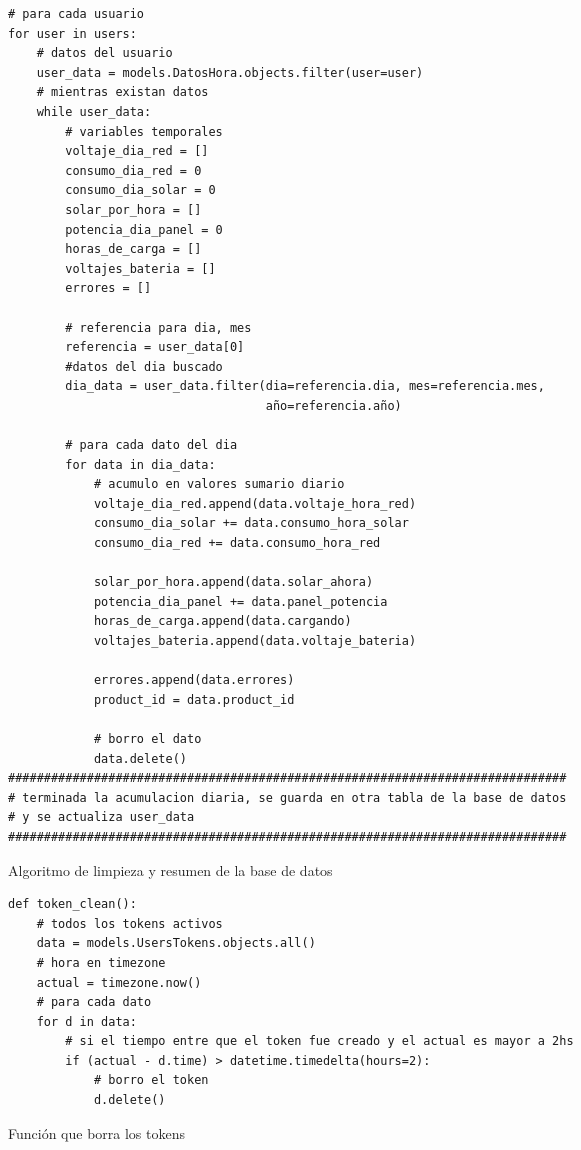 \begin{listing}[H]
\begin{verbatim}
# para cada usuario
for user in users:
    # datos del usuario
    user_data = models.DatosHora.objects.filter(user=user)
    # mientras existan datos
    while user_data:
        # variables temporales
        voltaje_dia_red = []
        consumo_dia_red = 0
        consumo_dia_solar = 0
        solar_por_hora = []
        potencia_dia_panel = 0
        horas_de_carga = []
        voltajes_bateria = []
        errores = []

        # referencia para dia, mes
        referencia = user_data[0]
        #datos del dia buscado
        dia_data = user_data.filter(dia=referencia.dia, mes=referencia.mes, 
                                    año=referencia.año)

        # para cada dato del dia
        for data in dia_data:
            # acumulo en valores sumario diario
            voltaje_dia_red.append(data.voltaje_hora_red)
            consumo_dia_solar += data.consumo_hora_solar
            consumo_dia_red += data.consumo_hora_red

            solar_por_hora.append(data.solar_ahora)
            potencia_dia_panel += data.panel_potencia
            horas_de_carga.append(data.cargando)
            voltajes_bateria.append(data.voltaje_bateria)

            errores.append(data.errores)
            product_id = data.product_id

            # borro el dato
            data.delete()
##############################################################################
# terminada la acumulacion diaria, se guarda en otra tabla de la base de datos
# y se actualiza user_data
##############################################################################
\end{verbatim}
\caption{Algoritmo de limpieza y resumen de la base de datos}
\label{algoritmo_sorter_user_mngmnt}
\end{listing}



\begin{listing}[H]
\begin{verbatim}
def token_clean():
    # todos los tokens activos
    data = models.UsersTokens.objects.all()
    # hora en timezone
    actual = timezone.now()
    # para cada dato
    for d in data:
        # si el tiempo entre que el token fue creado y el actual es mayor a 2hs
        if (actual - d.time) > datetime.timedelta(hours=2):
            # borro el token
            d.delete()
\end{verbatim}
\caption{Función que borra los tokens}
\label{algoritmo_borra_tokens_user_mngmnt}
\end{listing}

